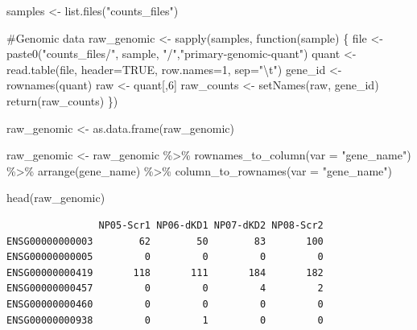 \documentclass[
  letterpaper,
  DIV=11,
  numbers=noendperiod]{scrartcl}
\newenvironment{Shaded}{\begin{snugshade}}{\end{snugshade}}
\newcommand{\AttributeTok}[1]{\textcolor[rgb]{0.40,0.45,0.13}{#1}}
\newcommand{\CommentTok}[1]{\textcolor[rgb]{0.37,0.37,0.37}{#1}}
\newcommand{\ConstantTok}[1]{\textcolor[rgb]{0.56,0.35,0.01}{#1}}
\newcommand{\ControlFlowTok}[1]{\textcolor[rgb]{0.00,0.23,0.31}{#1}}
\newcommand{\DecValTok}[1]{\textcolor[rgb]{0.68,0.00,0.00}{#1}}
\newcommand{\FunctionTok}[1]{\textcolor[rgb]{0.28,0.35,0.67}{#1}}
\newcommand{\NormalTok}[1]{\textcolor[rgb]{0.00,0.23,0.31}{#1}}
\newcommand{\OtherTok}[1]{\textcolor[rgb]{0.00,0.23,0.31}{#1}}
\newcommand{\SpecialCharTok}[1]{\textcolor[rgb]{0.37,0.37,0.37}{#1}}
\newcommand{\StringTok}[1]{\textcolor[rgb]{0.13,0.47,0.30}{#1}}
\begin{document}
\begin{Shaded}
\begin{Highlighting}[]
\NormalTok{samples }\OtherTok{\textless{}{-}} \FunctionTok{list.files}\NormalTok{(}\StringTok{"counts\_files"}\NormalTok{)}

\CommentTok{\#Genomic data}
\NormalTok{raw\_genomic }\OtherTok{\textless{}{-}} \FunctionTok{sapply}\NormalTok{(samples, }\ControlFlowTok{function}\NormalTok{(sample) \{}
\NormalTok{  file }\OtherTok{\textless{}{-}} \FunctionTok{paste0}\NormalTok{(}\StringTok{"counts\_files/"}\NormalTok{, sample, }\StringTok{"/"}\NormalTok{,}\StringTok{"primary{-}genomic{-}quant"}\NormalTok{)}
\NormalTok{  quant }\OtherTok{\textless{}{-}} \FunctionTok{read.table}\NormalTok{(file, }\AttributeTok{header=}\ConstantTok{TRUE}\NormalTok{, }\AttributeTok{row.names=}\DecValTok{1}\NormalTok{, }\AttributeTok{sep=}\StringTok{"}\SpecialCharTok{\textbackslash{}t}\StringTok{"}\NormalTok{)}
\NormalTok{  gene\_id }\OtherTok{\textless{}{-}} \FunctionTok{rownames}\NormalTok{(quant)}
\NormalTok{  raw }\OtherTok{\textless{}{-}}\NormalTok{ quant[,}\DecValTok{6}\NormalTok{]}
\NormalTok{  raw\_counts }\OtherTok{\textless{}{-}} \FunctionTok{setNames}\NormalTok{(raw, gene\_id)}
  \FunctionTok{return}\NormalTok{(raw\_counts)}
\NormalTok{\})}

\NormalTok{raw\_genomic }\OtherTok{\textless{}{-}} \FunctionTok{as.data.frame}\NormalTok{(raw\_genomic)}

\NormalTok{raw\_genomic }\OtherTok{\textless{}{-}}\NormalTok{ raw\_genomic }\SpecialCharTok{\%\textgreater{}\%}
  \FunctionTok{rownames\_to\_column}\NormalTok{(}\AttributeTok{var =} \StringTok{"gene\_name"}\NormalTok{) }\SpecialCharTok{\%\textgreater{}\%}
  \FunctionTok{arrange}\NormalTok{(gene\_name) }\SpecialCharTok{\%\textgreater{}\%}
  \FunctionTok{column\_to\_rownames}\NormalTok{(}\AttributeTok{var =} \StringTok{"gene\_name"}\NormalTok{)}

\FunctionTok{head}\NormalTok{(raw\_genomic)}
\end{Highlighting}
\end{Shaded}

\begin{verbatim}
                NP05-Scr1 NP06-dKD1 NP07-dKD2 NP08-Scr2
ENSG00000000003        62        50        83       100
ENSG00000000005         0         0         0         0
ENSG00000000419       118       111       184       182
ENSG00000000457         0         0         4         2
ENSG00000000460         0         0         0         0
ENSG00000000938         0         1         0         0
\end{verbatim}
\end{document}
